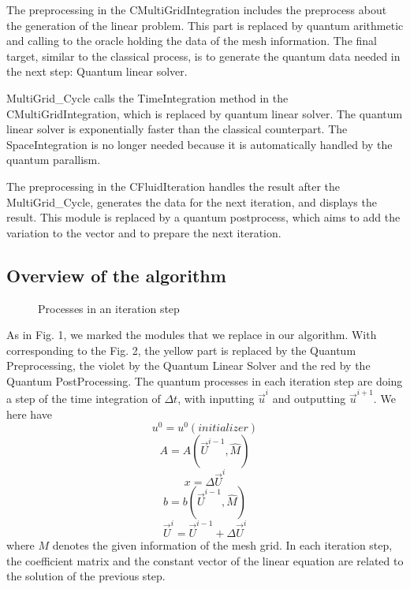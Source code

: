 \documentclass[%
 reprint,
 amsmath,amssymb,
pra,
]{revtex4-1}
\begin{document}
The preprocessing in the CMultiGridIntegration includes the preprocess about the generation of the linear problem. This part is replaced by quantum arithmetic and calling to the oracle holding the data of the mesh information. The final target, similar to the classical process, is to generate the quantum data needed in the next step: Quantum linear solver.

MultiGrid\_Cycle calls the TimeIntegration method in the CMultiGridIntegration, which is replaced by quantum linear solver. The quantum linear solver is exponentially faster than the classical counterpart. The SpaceIntegration is no longer needed because it is automatically handled by the quantum parallism.

The preprocessing in the CFluidIteration handles the result after the MultiGrid\_Cycle, generates the data for the next iteration, and displays the result. This module is replaced by a quantum postprocess, which aims to add the variation to the vector and to prepare the next iteration. 

\subsection{Overview of the algorithm}

\begin{figure}[htbp]
    \caption{Processes in an iteration step}
    \label{QuantumProcess1} 
\end{figure}

As in Fig. 1, we marked the modules that we replace in our algorithm. With corresponding to the Fig. 2, the yellow part is replaced by the Quantum Preprocessing, the violet by the Quantum Linear Solver and the red by the Quantum PostProcessing. The quantum processes in each iteration step are doing a step of the time integration of $\Delta t$, with inputting $\vec{u}^i$ and outputting $\vec{u}^{i+1}$. We here have
$$
u^0=u^0(initializer)
$$
$$
A=A(\vec{U}^{i-1},\hat{M})
$$
$$
x=\Delta \vec{U}^i
$$
$$
b=b(\vec{U}^{i-1},\hat{M})
$$
$$
\vec{U}^i=\vec{U}^{i-1}+\Delta \vec{U}^i
$$
where $M$ denotes the given information of the mesh grid. In each iteration step, the coefficient matrix and the constant vector of the linear equation are related to the solution of the previous step. 
\end{document}
